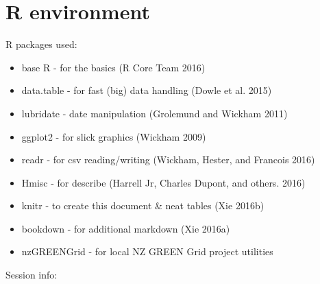 \documentclass[]{article}
\providecommand{\tightlist}{%
  \setlength{\itemsep}{0pt}\setlength{\parskip}{0pt}}
\theoremstyle{definition}
\theoremstyle{definition}
\theoremstyle{definition}
\theoremstyle{remark}
\begin{document}
\section{R environment}\label{r-environment}

R packages used:

\begin{itemize}
\tightlist
\item
  base R - for the basics (R Core Team 2016)
\item
  data.table - for fast (big) data handling (Dowle et al. 2015)
\item
  lubridate - date manipulation (Grolemund and Wickham 2011)
\item
  ggplot2 - for slick graphics (Wickham 2009)
\item
  readr - for csv reading/writing (Wickham, Hester, and Francois 2016)
\item
  Hmisc - for describe (Harrell Jr, Charles Dupont, and others. 2016)
\item
  knitr - to create this document \& neat tables (Xie 2016b)
\item
  bookdown - for additional markdown (Xie 2016a)
\item
  nzGREENGrid - for local NZ GREEN Grid project utilities
\end{itemize}

Session info:
\end{document}
